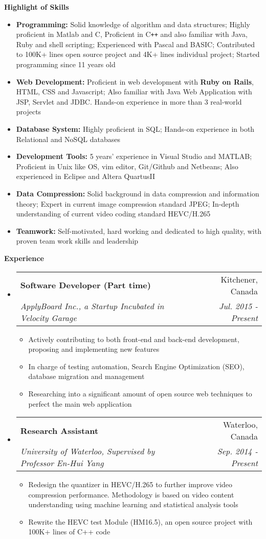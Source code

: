 \documentclass[letterpaper,10pt]{article}
\makeatletter
\newcommand{\resitem}[1]{\item #1 \vspace{-2pt}}
\newcommand{\resheading}[1]{{\large \colorbox{mygrey}{\begin{minipage}{\textwidth}{\textbf{#1 \vphantom{p\^{E}}}}\end{minipage}}}}
\newcommand{\ressubheading}[4]{
\begin{tabular*}{7.0in}{l@{\extracolsep{\fill}}r}
		\textbf{#1} & #2 \\
		\textit{#3} & \textit{#4} \\
\end{tabular*}\vspace{-6pt}}
\makeatother
\begin{document}
\resheading{Highlight of Skills}
\begin{itemize}
\itemsep0em
\item {\textbf {Programming:}} Solid knowledge of algorithm and data structures; Highly proficient in Matlab and C, Proficient in C{}\verb!++! and also familiar with Java, Ruby and shell scripting; Experienced with Pascal and BASIC; Contributed to 100K+ lines open source project and 4K+ lines individual project; Started programming since 11 years old
\item{\textbf {Web Development:}} Proficient in web development with \textbf{Ruby on Rails}, HTML, CSS and Javascript; Also familiar with Java Web Application with JSP, Servlet and JDBC. Hands-on experience in more than 3 real-world projects
\item{\textbf {Database System:}} Highly proficient in SQL; Hands-on experience in both Relational and NoSQL databases
\item{\textbf {Development Tools:}} 5 years' experience in Visual Studio and MATLAB; Proficient in Unix like OS, vim editor, Git/Github and Netbeans; Also experienced in Eclipse and Altera QuartusII
\item{\textbf {Data Compression:}} Solid background in data compression and information theory; Expert in current image compression standard JPEG; In-depth understanding of current video coding standard HEVC/H.265
\item{\textbf {Teamwork:}} Self-motivated, hard working and dedicated to high quality, with proven team work skills and leadership

\end{itemize}

\resheading{Experience}
\begin{itemize}
\itemsep0em
\item
	\ressubheading{Software Developer (Part time)}{Kitchener, Canada}{ApplyBoard Inc., a Startup Incubated in Velocity Garage}{ Jul. 2015 - Present}
	\begin{itemize}
		\resitem{Actively contributing to both front-end and back-end development, proposing and implementing new features}
		\resitem{In charge of testing automation, Search Engine Optimization (SEO), database migration and management}
		\resitem{Researching into a significant amount of open source web techniques to perfect the main web application}
	\end{itemize}
\item
	\ressubheading{Research Assistant}{Waterloo, Canada}{University of Waterloo, Supervised by Professor En-Hui Yang}{Sep. 2014 - Present}
	\begin{itemize}
		\resitem{Redesign the quantizer in HEVC/H.265 to further improve video compression performance. Methodology is based on video content understanding using machine learning and statistical analysis tools}
		\resitem{Rewrite the HEVC test Module (HM16.5), an open source project with 100K+ lines of C++ code}
	\end{itemize}
\end{itemize}
\end{document}
